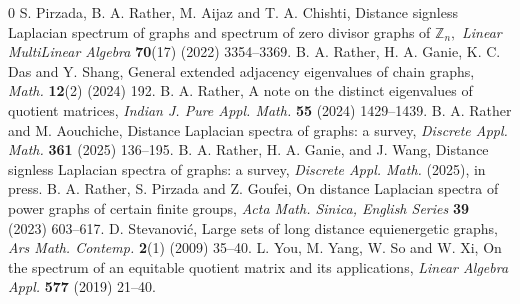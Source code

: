 \documentclass[12pt,twoside]{article}
\begin{document}
\begin{thebibliography}{0}
	S. Pirzada, B. A. Rather, M. Aijaz and T. A. Chishti, Distance signless Laplacian spectrum of graphs and spectrum of zero divisor graphs of  $ \mathbb{Z}_{n}, $  \emph{Linear MultiLinear Algebra} \textbf{70}(17) (2022) 3354--3369.
 B. A. Rather, H. A. Ganie, K. C. Das and Y. Shang, General extended adjacency eigenvalues of chain graphs,  \emph{Math.} \textbf{12}(2) (2024) 192.
 B. A. Rather, A note on the distinct eigenvalues of quotient matrices, \textit{Indian J. Pure Appl. Math.} \textbf{55} (2024) 1429--1439.
 B. A. Rather and M. Aouchiche, Distance Laplacian spectra of graphs: a survey, \emph{Discrete Appl. Math.} \textbf{361} (2025) 136--195.
 B. A. Rather, H. A. Ganie, and J. Wang, Distance signless Laplacian spectra of graphs: a survey, \emph{Discrete Appl. Math.} (2025), in press.
  B. A. Rather, S. Pirzada and Z. Goufei, On distance Laplacian spectra of power graphs of certain finite groups, \emph{Acta Math. Sinica, English Series} \textbf{39} (2023) 603--617.
 D. Stevanovi\'{c},  Large sets of long distance equienergetic graphs,  \textit{Ars Math. Contemp.} {\bf 2}(1) (2009) 35--40.
 {L. You, M. Yang, W. So and W. Xi, On the spectrum of an equitable quotient matrix and its applications, \textit{Linear Algebra Appl.}} {\bf 577} (2019) 21--40.

\end{thebibliography}
\end{document}

